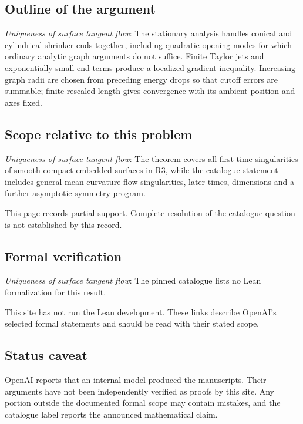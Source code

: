 \documentclass[11pt]{article}
\begin{document}
\subsection{Outline of the argument}
\textit{Uniqueness of surface tangent flow}: The stationary analysis handles conical and cylindrical shrinker ends together, including quadratic opening modes for which ordinary analytic graph arguments do not suffice. Finite Taylor jets and exponentially small end terms produce a localized gradient inequality. Increasing graph radii are chosen from preceding energy drops so that cutoff errors are summable; finite rescaled length gives convergence with its ambient position and axes fixed.

\subsection{Scope relative to this problem}
\textit{Uniqueness of surface tangent flow}: The theorem covers all first-time singularities of smooth compact embedded surfaces in R3, while the catalogue statement includes general mean-curvature-flow singularities, later times, dimensions and a further asymptotic-symmetry program.

This page records partial support. Complete resolution of the catalogue question is not established by this record.

\subsection{Formal verification}
\textit{Uniqueness of surface tangent flow}: The pinned catalogue lists no Lean formalization for this result.

This site has not run the Lean development. These links describe OpenAI’s selected formal statements and should be read with their stated scope.

\subsection{Status caveat}
OpenAI reports that an internal model produced the manuscripts. Their arguments have not been independently verified as proofs by this site. Any portion outside the documented formal scope may contain mistakes, and the catalogue label reports the announced mathematical claim.
\end{document}
